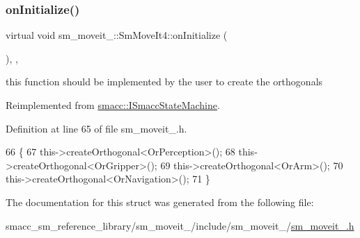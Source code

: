 \subsubsection{\texorpdfstring{on\+Initialize()}{onInitialize()}}
{\footnotesize\ttfamily virtual void sm\+\_\+moveit\+\_\+::\+Sm\+Move\+It4\+::on\+Initialize (\begin{DoxyParamCaption}{ }\end{DoxyParamCaption})\hspace{0.3cm}{\ttfamily [inline]}, {\ttfamily [override]}, {\ttfamily [virtual]}}



this function should be implemented by the user to create the orthogonals 



Reimplemented from \hyperlink{classsmacc_1_1ISmaccStateMachine_ac2982c6c8283663e5e1e8a7c82f511ec}{smacc\+::\+I\+Smacc\+State\+Machine}.



Definition at line 65 of file sm\+\_\+moveit\+\_.\+h.


\begin{DoxyCode}
66     \{
67         this->createOrthogonal<OrPerception>();
68         this->createOrthogonal<OrGripper>();
69         this->createOrthogonal<OrArm>();
70         this->createOrthogonal<OrNavigation>();
71     \}
\end{DoxyCode}


The documentation for this struct was generated from the following file\+:\begin{DoxyCompactItemize}
\item 
smacc\+\_\+sm\+\_\+reference\+\_\+library/sm\+\_\+moveit\+\_/include/sm\+\_\+moveit\+\_/\hyperlink{sm__moveit__4_8h}{sm\+\_\+moveit\+\_.\+h}\end{DoxyCompactItemize}
